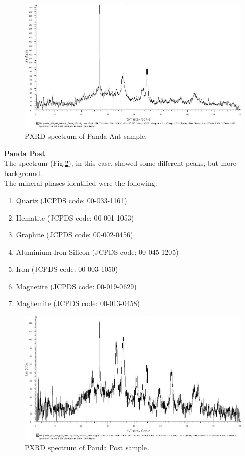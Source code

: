 \begin{figure}[H]
\centering
    \includegraphics[scale=0.46]{images/panda_169_ant_edit.jpg}
    \caption{PXRD spectrum of Panda Ant sample.}
    \label{fig:Panda_Ant_PXRD}
\end{figure} 

\textbf{Panda Post} \\
The spectrum (Fig.\ref{fig:Panda_Post_PXRD}), in this case, showed some different peaks, but more background. \\
The mineral phases identified were the following:

\begin{enumerate}[noitemsep]
    \item Quartz (JCPDS code: 00-033-1161)
    \item Hematite (JCPDS code: 00-001-1053)
    \item Graphite (JCPDS code: 00-002-0456)
    \item Aluminium Iron Silicon (JCPDS code: 00-045-1205)
    \item Iron (JCPDS code: 00-003-1050)
    \item Magnetite (JCPDS code: 00-019-0629)
    \item Maghemite (JCPDS code: 00-013-0458)
\end{enumerate}

\begin{figure}[H]
\centering
    \includegraphics[scale=0.46]{images/panda_169_post_edit.jpg}
    \caption{PXRD spectrum of Panda Post sample.}
    \label{fig:Panda_Post_PXRD}
\end{figure} 

